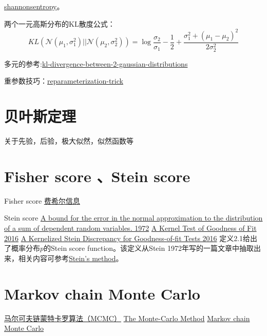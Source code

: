 \href{https://planetmath.org/shannonsentropy}{shannonsentropy}。

两个一元高斯分布的KL散度公式：
\begin{equation}
K L\left(\mathcal{N}\left(\mu_1, \sigma_1^2\right)|| 
\mathcal{N}\left(\mu_2, \sigma_2^2\right)\right)=
\log \frac{\sigma_2}{\sigma_1}-\frac{1}{2}+\frac{\sigma_1^2+
\left(\mu_1-\mu_2\right)^2}{2 \sigma_2^2}
\end{equation}

多元的参考:\href{https://mr-easy.github.io/2020-04-16-kl-divergence-between-2-gaussian-distributions/}{kl-divergence-between-2-gaussian-distributions}

重参数技巧：\href{https://lilianweng.github.io/posts/2018-08-12-vae/#reparameterization-trick}{reparameterization-trick}




\section{贝叶斯定理}
关于先验，后验，极大似然，似然函数等




\section{Fisher score 、Stein score}
Fisher score
\href{https://zh.wikipedia.org/wiki/%E8%B4%B9%E5%B8%8C%E5%B0%94%E4%BF%A1%E6%81%AF}{费希尔信息}

Stein score 
\href{https://projecteuclid.org/ebooks/berkeley-symposium-on-mathematical-statistics-and-probability/Proceedings-of-the-Sixth-Berkeley-Symposium-on-Mathematical-Statistics-and/chapter/A-bound-for-the-error-in-the-normal-approximation-to/bsmsp/1200514239}{A bound for the error in the normal approximation to
the distribution of a sum of dependent random variables. 1972}
\href{http://proceedings.mlr.press/v48/chwialkowski16.pdf}{A Kernel Test of Goodness of Fit 2016}
\href{https://arxiv.org/pdf/1602.03253.pdf}{A Kernelized Stein Discrepancy for Goodness-of-fit Tests 2016}
定义2.1给出了概率分布$p$的Stein score function。该定义从Stein 1972年写的一篇文章中抽取出来，相关内容可参考\href{https://en.wikipedia.org/wiki/Stein%27s_method}{Stein's method}。





\section{Markov chain Monte Carlo}
\href{https://zhuanlan.zhihu.com/p/37121528}{马尔可夫链蒙特卡罗算法（MCMC）}
\href{https://web.math.ucsb.edu/~atzberg/pmwiki_intranet/uploads/AtzbergerHomePage/Atzberger_MonteCarlo.pdf}{The Monte-Carlo Method}
\href{https://en.wikipedia.org/wiki/Markov_chain_Monte_Carlo}{Markov chain Monte Carlo}

